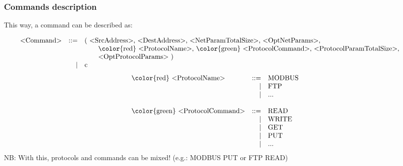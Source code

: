 \documentclass{beamer}
\begin{document}
\begin{frame}
    \frametitle{Commands description}

    This way, a command can be described as:

    {\scriptsize
    \[
    \hspace{-1.6em}
        \begin{array}{l r l}
            \text{<Command>} & ::= & \text{( <SrcAddress>, <DestAddress>, <NetParamTotalSize>, <OptNetParams>,} \\
                             &     & \text{~~~~~~{\color{red} <ProtocolName>}, {\color{green} <ProtocolCommand>}, <ProtocolParamTotalSize>,} \\
                             &     & \text{~~~~~~<OptProtocolParams> )} \\
                             &   | & \text{c} \\
        \end{array}
    \]
    }
    \pause
    \vfill
    {\scriptsize
    \[
        \begin{array}{l r l}
            \text{{\color{red} <ProtocolName>}}      & ::= & \text{MODBUS} \\
                                                     &   | & \text{FTP} \\
                                                     &   | & \text{...} \\
                                                     &     & \\
            \text{{\color{green} <ProtocolCommand>}} & ::= & \text{READ} \\
                                                     &   | & \text{WRITE} \\
                                                     &   | & \text{GET} \\
                                                     &   | & \text{PUT} \\
                                                     &   | & \text{...} \\
        \end{array}
    \]
    }
    \vfill
    {\scriptsize
    NB: With this, protocols and commands can be mixed! (e.g.: MODBUS PUT or FTP READ)
    }
\end{frame}
\end{document}
